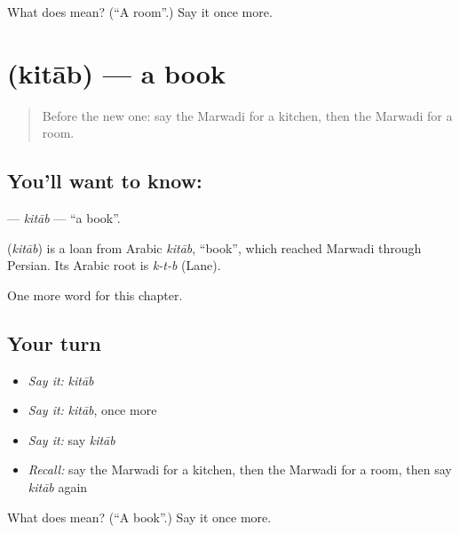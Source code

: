 \begin{tcolorbox}[breakable,colback=teal!4,colframe=teal!35!black,title={Before you move on}]
What does  mean? (\textquotedblleft{}A room\textquotedblright{}.) Say it once more.
\end{tcolorbox}
\section[\texorpdfstring{\mw{किताब} (kitāb)}{किताब (kitāb)}]{ (kitāb) — a book}

\label{lesson:MW-C65-kitab}



\begin{quote}
Before the new one: say the Marwadi for a kitchen, then the Marwadi for a room.
\end{quote}

\subsection*{You'll want to know: }
\textbf{} — \emph{kitāb} — \textquotedblleft{}a book\textquotedblright{}.

\begin{cousinweb}
\textbf{} (\emph{kitāb}) is a loan from Arabic \emph{kitāb}, \textquotedblleft{}book\textquotedblright{}, which reached Marwadi through Persian. Its Arabic root is \emph{k-t-b} (Lane).
\end{cousinweb}

\begin{grammarlens}[title={What you've built}]
One more word for this chapter.
\end{grammarlens}

\subsection*{Your turn}
\begin{itemize}
\raggedright
  \item \emph{Say it:} \emph{kitāb}
  \item \emph{Say it:} \emph{kitāb}, once more
  \item \emph{Say it:} say \emph{kitāb}
  \item \emph{Recall:} say the Marwadi for a kitchen, then the Marwadi for a room, then say \emph{kitāb} again
\end{itemize}

\begin{tcolorbox}[breakable,colback=teal!4,colframe=teal!35!black,title={Before you move on}]
What does  mean? (\textquotedblleft{}A book\textquotedblright{}.) Say it once more.
\end{tcolorbox}
